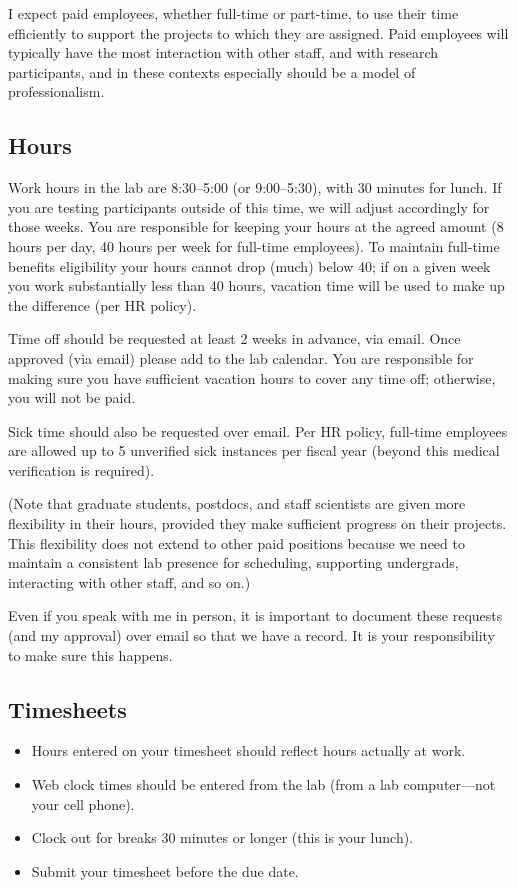 \documentclass[letterpaper,12pt,oneside]{memoir}
\begin{document}
I expect paid employees, whether full-time or part-time, to use their time efficiently to support the projects to which they are assigned. Paid employees will typically have the most interaction with other staff, and with research participants, and in these contexts especially should be a model of professionalism.

\subsection{Hours}
Work hours in the lab are 8:30--5:00 (or 9:00--5:30), with 30 minutes for lunch. If you are testing participants outside of this time, we will adjust accordingly for those weeks. You are responsible for keeping your hours at the agreed amount (8 hours per day, 40 hours per week for full-time employees). To maintain full-time benefits eligibility your hours cannot drop (much) below 40; if on a given week you work substantially less than 40 hours, vacation time will be used to make up the difference (per HR policy).

Time off should be requested at least 2 weeks in advance, via email. Once approved (via email) please add to the lab calendar. You are responsible for making sure you have sufficient vacation hours to cover any time off; otherwise, you will not be paid.

Sick time should also be requested over email. Per HR policy, full-time employees are allowed up to 5 unverified sick instances per fiscal year (beyond this medical verification is required).

(Note that graduate students, postdocs, and staff scientists are given more flexibility in their hours, provided they make sufficient progress on their projects. This flexibility does not extend to other paid positions because we need to maintain a consistent lab presence for scheduling, supporting undergrads, interacting with other staff, and so on.)

\begin{shaded}
\noindent Even if you speak with me in person, it is important to document these requests (and my approval) over email so that we have a record. It is your responsibility to make sure this happens.
\end{shaded}

\subsection{Timesheets}

\begin{itemize}
\item Hours entered on your timesheet should reflect hours actually at work.
\item Web clock times should be entered from the lab (from a lab computer---not your cell phone).
\item Clock out for breaks 30 minutes or longer (this is your lunch).
\item Submit your timesheet before the due date.
\end{itemize}
\end{document}
